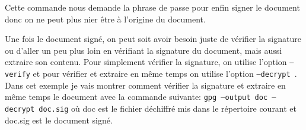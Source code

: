 Cette commande nous demande la phrase de passe pour enfin signer le document donc on ne peut plus nier être à l'origine du
document.
 
Une fois le document signé, on peut soit avoir besoin juste de vérifier la signature ou d'aller un peu plus loin en vérifiant la signature du document, mais aussi extraire son contenu.
Pour simplement vérifier la signature, on utilise l'option \texttt{--verify} et pour vérifier et extraire en même temps on utilise l'option
\texttt{--decrypt }.
Dans cet exemple je vais montrer comment vérifier la signature et extraire en même temps le document avec la commande suivante:
 \texttt{gpg --output doc --decrypt doc.sig} où doc est le fichier déchiffré mis dans le répertoire courant et doc.sig est le document signé.
 

 






